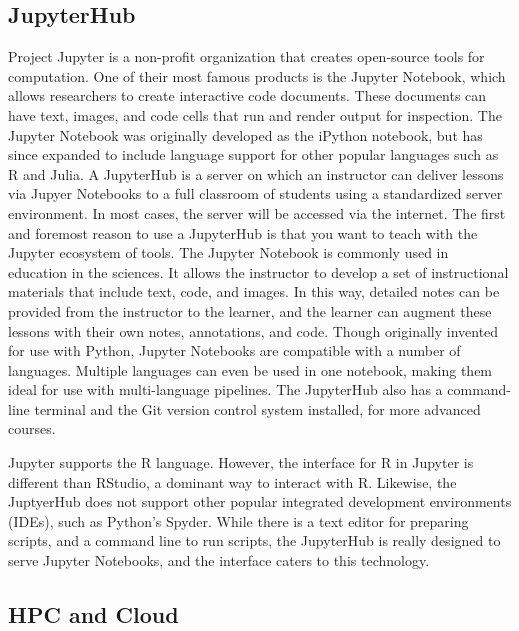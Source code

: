 \subsection{JupyterHub}\label{JupyterHub}

Project Jupyter is a non-profit organization that creates open-source tools for computation.
One of their most famous products is the Jupyter Notebook, which allows researchers to create interactive code documents.
These documents can have text, images, and code cells that run and render output for inspection.
The Jupyter Notebook was originally developed as the iPython notebook, but has since expanded to include language support for other popular languages such as R and Julia.
A JupyterHub is a server on which an instructor can deliver lessons via Jupyer Notebooks to a full classroom of students using a standardized server environment.
In most cases, the server will be accessed via the internet.
The first and foremost reason to use a JupyterHub is that you want to teach with the Jupyter ecosystem of tools.
The Jupyter Notebook is commonly used in education in the sciences.
It allows the instructor to develop a set of instructional materials that include text, code, and images.
In this way, detailed notes can be provided from the instructor to the learner, and the learner can augment these lessons with their own notes, annotations, and code.
Though originally invented for use with Python, Jupyter Notebooks are compatible with a number of languages.
Multiple languages can even be used in one notebook, making them ideal for use with multi-language pipelines.
The JupyterHub also has a command-line terminal and the Git version control system installed, for more advanced courses.

Jupyter supports the R language.
However, the interface for R in Jupyter is different than RStudio, a dominant way to interact with R.
Likewise, the JuptyerHub does not support other popular integrated development environments (IDEs), such as Python's Spyder.
While there is a text editor for preparing scripts, and a command line to run scripts, the JupyterHub is really designed to serve Jupyter Notebooks, and the interface caters to this technology.



\subsection{HPC and Cloud}\label{HPC}

